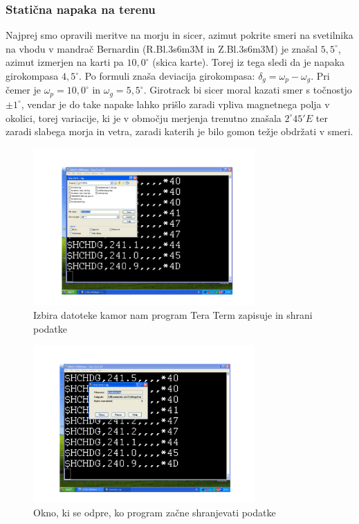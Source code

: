 \subsubsection{Statična napaka na terenu}
Najprej smo opravili meritve na morju in sicer, azimut pokrite smeri na svetilnika na vhodu v mandrač Bernardin (R.Bl.3s6m3M in Z.Bl.3s6m3M) je znašal $5,5^{\circ}$, azimut izmerjen na karti pa $10,0^{\circ}$ (skica karte). Torej iz tega sledi da je napaka girokompasa $4,5^{\circ}$. Po formuli znaša deviacija girokompasa: $\delta_g = \omega_p - \omega_g$. Pri čemer je $\omega_p = 10,0^{\circ}$ in $\omega_g = 5,5^{\circ}$.
Girotrack bi sicer moral kazati smer s točnostjo $\pm 1^{\circ}$, vendar je do take napake lahko prišlo zaradi vpliva magnetnega polja v okolici, torej variacije, ki je v območju merjenja trenutno znašala $2^{\circ}45'E$ ter zaradi slabega morja in vetra, zaradi katerih je bilo gomon težje obdržati v smeri.

\begin{figure}
	\centering
	\includegraphics[height=6cm]{Vaje/VzorecPoroc/figs/IzbiraDatoteke.pdf}
	\caption{Izbira datoteke kamor nam program Tera Term zapisuje in shrani podatke}
	\label{fig:TT_datotek}       %
\end{figure}

\begin{figure}
	\centering
	\includegraphics[height=6cm]{Vaje/VzorecPoroc/figs/ShranDatoteke.pdf}
	\caption{Okno, ki se odpre, ko program začne shranjevati podatke}
	\label{fig:TT_shran}       %
\end{figure}

